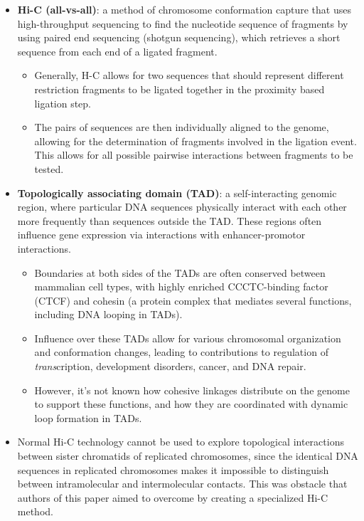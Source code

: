 \documentclass[plain,basic]{inVerba-notes}
\begin{document}
    \begin{itemize}
    \item \textbf{Hi-C (all-vs-all)}: a method of chromosome conformation capture that uses high-throughput sequencing to find the nucleotide sequence of fragments by using paired end sequencing (shotgun sequencing), which retrieves a short sequence from each end of a ligated fragment. 
        \begin{itemize}
            \item Generally, H-C allows for two sequences that should represent different restriction fragments to be ligated together in the proximity based ligation step.
            \item The pairs of sequences are then individually aligned to the genome, allowing for the determination of fragments involved in the ligation event. This allows for all possible pairwise interactions between fragments to be tested.
        \end{itemize}
    \item \textbf{Topologically associating domain (TAD)}: a self-interacting genomic region, where particular DNA sequences physically interact with each other more frequently than sequences outside the TAD\@. These regions often influence gene expression via interactions with enhancer-promotor interactions.
        \begin{itemize}
            \item Boundaries at both sides of the TADs are often conserved between mammalian cell types, with highly enriched CCCTC-binding factor (CTCF) and cohesin (a protein complex that mediates several functions, including DNA looping in TADs). 
            \item Influence over these TADs allow for various chromosomal organization and conformation changes, leading to contributions to regulation of \textit{trans}cription, development disorders, cancer, and DNA repair.
            \item However, it's not known how cohesive linkages distribute on the genome to support these functions, and how they are coordinated with dynamic loop formation in TADs.
        \end{itemize}
    \item Normal Hi-C technology cannot be used to explore topological interactions between sister chromatids of replicated chromosomes, since the identical DNA sequences in replicated chromosomes makes it impossible to distinguish between intramolecular and intermolecular contacts. This was obstacle that authors of this paper aimed to overcome by creating a specialized Hi-C method. 
\end{itemize}
\end{document}

